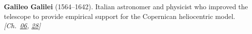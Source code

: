 \textbf{Galileo Galilei} (1564–1642). Italian astronomer and physicist who improved the telescope to provide empirical support for the Copernican heliocentric model. \emph{[Ch.~\hyperref[ch:gravitytimedilation]{06}, \hyperref[ch:negativetemperature]{28}]}

